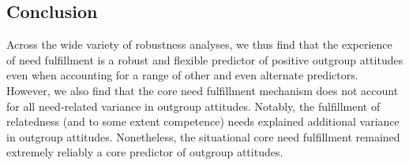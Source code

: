 \documentclass[man, 12pt, a4paper, mask]{apa7}
\theoremstyle{break}
\theoremstyle{plain}
\begin{document}


\subsection{Conclusion}
Across the wide variety of robustness analyses, we thus find that the experience of need fulfillment is a robust and flexible predictor of positive outgroup attitudes even when accounting for a range of other and even alternate predictors. However, we also find that the core need fulfillment mechanism does not account for all need-related variance in outgroup attitudes. Notably, the fulfillment of relatedness (and to some extent competence) needs explained additional variance in outgroup attitudes. Nonetheless, the situational core need fulfillment remained extremely reliably a core predictor of outgroup attitudes.



\end{document}
